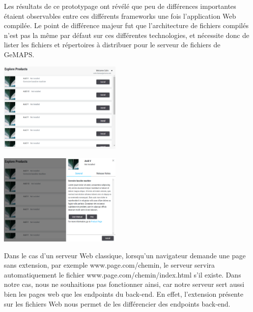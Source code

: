 \documentclass[francais]{rapportPFE}  %
\begin{document}
Les résultats de ce prototypage ont révélé que peu de différences importantes étaient observables entre ces différents frameworks une fois l'application Web compilée. Le point de différence majeur fut que l'architecture de fichiers compilés n'est pas la même par défaut sur ces différentes technologies, et nécessite donc de lister les fichiers et répertoires à distribuer pour le serveur de fichiers de GeMAPS.

\begin{center}
    \centering
    \begin{minipage}{.5\textwidth}
    \centering
    \includegraphics[width=6cm]{graphics/vue_demo.png}
    \label{fig:test1}
    \end{minipage}%
    \begin{minipage}{.5\textwidth}
    \centering
    \includegraphics[width=6cm]{graphics/vue_demo2.png}
    \label{fig:test2}
    \end{minipage}
    \end{center}

Dans le cas d'un serveur Web classique, lorsqu'un navigateur demande une page sans extension, par exemple www.page.com/chemin, le serveur servira automatiquement le fichier www.page.com/chemin/index.html s'il existe. Dans notre cas, nous ne souhaitions pas fonctionner ainsi, car notre serveur sert aussi bien les pages web que les endpoints du back-end. En effet, l'extension présente sur les fichiers Web nous permet de les différencier des endpoints back-end.
    
\end{document}
